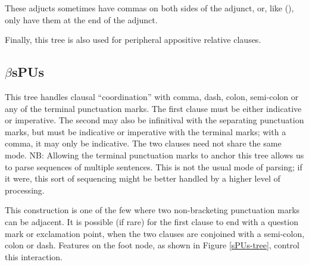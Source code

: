 These adjucts sometimes have commas on both sides of the adjunct, or,
like (), only have them at the end of the adjunct.

Finally, this tree is also used for peripheral appositive relative
clauses.



\subsection{$\beta$sPUs}
\label{sPUs}

This tree handles clausal ``coordination'' with comma, dash, colon,
semi-colon or any of the terminal punctuation marks. The first clause
must be either indicative or imperative. The second may also be
infinitival with the separating punctuation marks, but must be
indicative or imperative with the terminal marks; with a comma, it may
only be indicative. The two clauses need not share the same mode. NB:
Allowing the terminal punctuation marks to anchor this tree allows us
to parse sequences of multiple sentences. This is not the usual mode
of parsing; if it were, this sort of sequencing might be better
handled by a higher level of processing.



This construction is one of the few where two non-bracketing
punctuation marks can be adjacent. It is possible (if rare) for the
first clause to end with a question mark or exclamation point, when
the two clauses are conjoined with a semi-colon, colon or
dash. Features on the foot node, as shown in Figure \ref{sPUs-tree}, control
this interaction.

